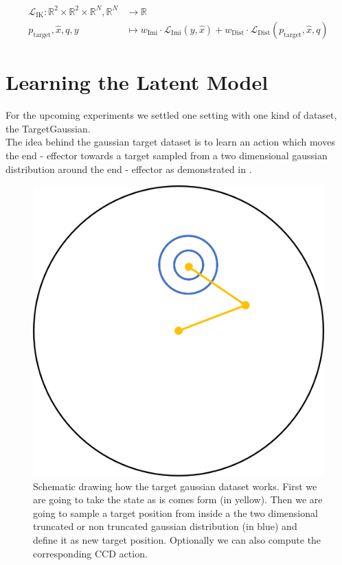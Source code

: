 \begin{equation}\label{eqn:IK-Loss}
    \begin{split}
        \mathcal{L}_\text{IK}: \mathbb{R}^2 \times \mathbb{R}^2 \times \mathbb{R}^N, \mathbb{R}^N & \to \mathbb{R} \\
        p_\text{target}, \hat{x}, q, y  &\mapsto w_\text{Imi} \cdot \mathcal{L}_\text{Imi}(y, \hat{x}) + w_\text{Dist} \cdot \mathcal{L}_\text{Dist}(p_\text{target}, \hat{x}, q)
    \end{split}
\end{equation}

\section{Learning the Latent Model}

For the upcoming experiments we settled one setting with one kind of dataset, the TargetGaussian. \\
The idea behind the gaussian target dataset is to learn an action which moves the end - effector towards a target sampled from a two dimensional gaussian distribution around the end - effector as demonstrated in .
\begin{figure}
    \begin{center}
        \includegraphics[width=0.3 \linewidth]{figures/experiments/VAE/TargetGaussian.png}
    \end{center}
    \caption[Target Gaussian Schematics]{Schematic drawing how the target gaussian dataset works. First we are going to take the state as is comes form  (in yellow). Then we are going to sample a target position from inside a the two dimensional truncated or non truncated gaussian distribution (in blue) and define it as new target position. Optionally we can also compute the corresponding CCD action.}
    \label{fig:TargetGaussian_Schematics}
\end{figure}

